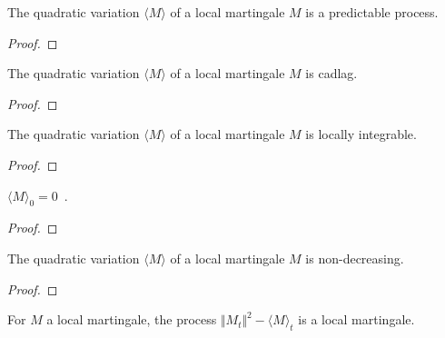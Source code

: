 \begin{lemma}\label{lem:predictable_quadraticVariation}
The quadratic variation $\langle M \rangle$ of a local martingale $M$ is a predictable process.
\end{lemma}

\begin{proof}

\end{proof}


\begin{lemma}\label{lem:cadlag_quadraticVariation}
The quadratic variation $\langle M \rangle$ of a local martingale $M$ is cadlag.
\end{lemma}

\begin{proof}

\end{proof}


\begin{lemma}\label{lem:locallyIntegrable_quadraticVariation}
The quadratic variation $\langle M \rangle$ of a local martingale $M$ is locally integrable.
\end{lemma}

\begin{proof}

\end{proof}


\begin{lemma}\label{lem:quadraticVariation_zero}
$\langle M \rangle_0 = 0$~.
\end{lemma}

\begin{proof}

\end{proof}


\begin{lemma}\label{lem:monotone_quadraticVariation}
The quadratic variation $\langle M \rangle$ of a local martingale $M$ is non-decreasing.
\end{lemma}

\begin{proof}

\end{proof}


\begin{lemma}\label{lem:local_martingale_sub_quadraticVariation}
For $M$ a local martingale, the process $\Vert M_t \Vert^2 - \langle M \rangle_t$ is a local martingale.
\end{lemma}

